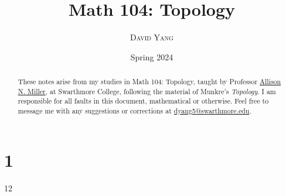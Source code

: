 \documentclass[11pt]{article}
\begin{document}
\title{\LARGE \textbf{Math 104: Topology}}
\date{Spring 2024}
\author{\textsc{David Yang}}

\maketitle

\begin{abstract}
These notes arise from my studies in Math 104: Topology, taught by 
Professor \href{https://sites.google.com/view/anmiller/}{Allison N. Miller}, at Swarthmore College, following the material of Munkre's \textit{Topology}.
I am responsible for all faults in this document, mathematical or otherwise.
Feel free to message me with any suggestions or corrections at \href{mailto:dyang5@swarthmore.edu}{dyang5@swarthmore.edu}.
\end{abstract}

\tableofcontents

\chapter{1}{12}
\end{document}
